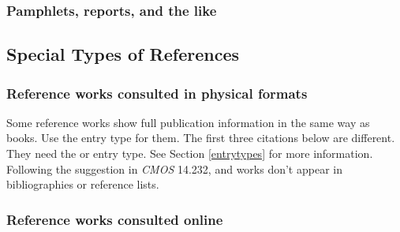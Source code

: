 \documentclass[11pt,letterpaper,oneside]{article}
\begin{document}
\setcounter{subsubsection}{219}
\subsubsection{Pamphlets, reports, and the like}

\begin{citebib}
\item \cite{lifestyles1996}
\item \cite{mcdonalds2014}
\item \cite[¶2,620]{standardtax1996}
\end{citebib}

\setcounter{subsection}{8}
\subsection{Special Types of References}
\setcounter{subsection}{14}

\setcounter{subsubsection}{231}
\subsubsection{Reference works consulted in physical formats}
\label{14.232}

Some reference works show full publication information in the same way
as books. Use the  entry type for them. The first three
citations below are different. They need the  or
 entry type. See Section \ref{entrytypes} for
more information. Following the suggestion in \textit{CMOS} 14.232,
 and  works don't appear in
bibliographies or reference lists.

\begin{citebib}
\item \cite{salvation1980}
\item \cite{hootananny2009}
\item \cite{dab1937}
\item \cite[s.vv. \mkbibquote{police ranks}, \mkbibquote{postal addresses}]{timestyle2003}
\item \cite[6.8.2]{mla2008}
\end{citebib}

\subsubsection{Reference works consulted online}
\label{14.233}
\end{document}
